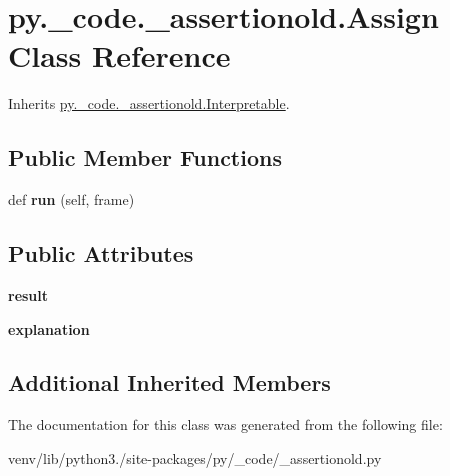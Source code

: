\hypertarget{classpy_1_1__code_1_1__assertionold_1_1_assign}{}\section{py.\+\_\+code.\+\_\+assertionold.\+Assign Class Reference}
\label{classpy_1_1__code_1_1__assertionold_1_1_assign}


Inherits \hyperlink{classpy_1_1__code_1_1__assertionold_1_1_interpretable}{py.\+\_\+code.\+\_\+assertionold.\+Interpretable}.

\subsection*{Public Member Functions}
\begin{DoxyCompactItemize}
\item 
\mbox{\label{classpy_1_1__code_1_1__assertionold_1_1_assign_ad3994532e720df04a6df4bfaa66b0c89}} 
def {\bfseries run} (self, frame)
\end{DoxyCompactItemize}
\subsection*{Public Attributes}
\begin{DoxyCompactItemize}
\item 
\mbox{\label{classpy_1_1__code_1_1__assertionold_1_1_assign_a5984741a630956c51f3e5a2d3de8f3e2}} 
{\bfseries result}
\item 
\mbox{\label{classpy_1_1__code_1_1__assertionold_1_1_assign_a7f953f13159d7b4eea79f5f1dea1d419}} 
{\bfseries explanation}
\end{DoxyCompactItemize}
\subsection*{Additional Inherited Members}


The documentation for this class was generated from the following file\+:\begin{DoxyCompactItemize}
\item 
venv/lib/python3./site-\/packages/py/\+\_\+code/\+\_\+assertionold.\+py\end{DoxyCompactItemize}
